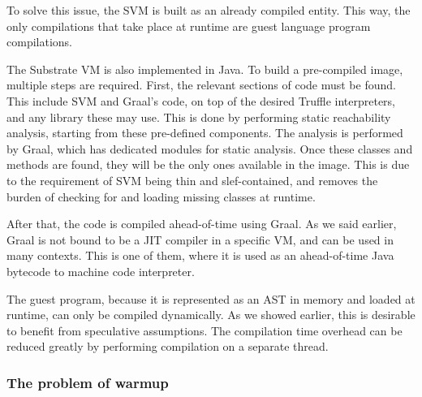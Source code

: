 \documentclass[twoside,11pt,a4paper]{article}
\begin{document}
To solve this issue, the SVM is built as an already compiled entity. This way, the only compilations that take place at runtime are guest language program compilations.

The Substrate VM is also implemented in Java. To build a pre-compiled image, multiple steps are required. First, the relevant sections of code must be found. This include SVM and Graal's code, on top of the desired Truffle interpreters, and any library these may use. This is done by performing static reachability analysis, starting from these pre-defined components. The analysis is performed by Graal, which has dedicated modules for static analysis. Once these classes and methods are found, they will be the only ones available in the image. This is due to the requirement of SVM being thin and slef-contained, and removes the burden of checking for and loading missing classes at runtime.

After that, the code is compiled ahead-of-time using Graal. As we said earlier, Graal is not bound to be a JIT compiler in a specific VM, and can be used in many contexts. This is one of them, where it is used as an ahead-of-time Java bytecode to machine code interpreter.



The guest program, because it is represented as an AST in memory and loaded at runtime, can only be compiled dynamically. As we showed earlier, this is desirable to benefit from speculative assumptions. The compilation time overhead can be reduced greatly by performing compilation on a separate thread.



\subsubsection{The problem of warmup}
\end{document}
